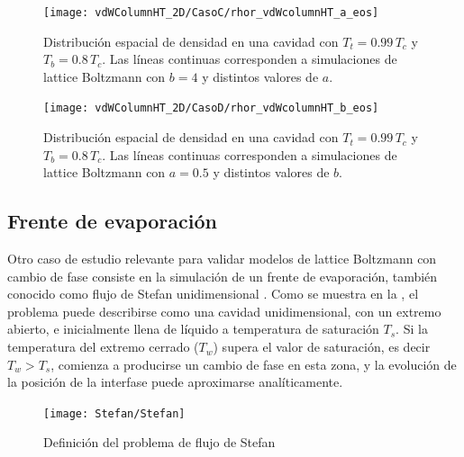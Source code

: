 \begin{figure}[ht]
	\centering
	\texttt{[image: vdWColumnHT\_2D/CasoC/rhor\_vdWcolumnHT\_a\_eos]}
	\caption{Distribuci\'on espacial de densidad en una cavidad con $T_t = 0.99 \, T_c$ y $T_b = 0.8 \, T_c$. Las l\'ineas continuas corresponden a simulaciones de lattice Boltzmann con $b=4$ y distintos valores de $a$.}
	\label{fig:vdWColumnHT_rhor_a_eos}
\end{figure}

\begin{figure}[ht]
	\centering
	\texttt{[image: vdWColumnHT\_2D/CasoD/rhor\_vdWcolumnHT\_b\_eos]}
	\caption{Distribuci\'on espacial de densidad en una cavidad con $T_t = 0.99 \, T_c$ y $T_b = 0.8 \, T_c$. Las l\'ineas continuas corresponden a simulaciones de lattice Boltzmann con $a=0.5$ y distintos valores de $b$.}
	\label{fig:vdWColumnHT_rhor_b_eos}
\end{figure}
\FloatBarrier



\subsection{Frente de evaporaci\'on}
\label{sec:stefan_d2q9}

Otro caso de estudio relevante para validar modelos de lattice Boltzmann con cambio de fase consiste en la simulaci\'on de un frente de evaporaci\'on, tambi\'en conocido como flujo de Stefan unidimensional \cite{alexiades_mathematical_1993}. Como se muestra en la , el problema puede describirse como una cavidad unidimensional, con un extremo abierto, e inicialmente llena de l\'iquido a temperatura de saturaci\'on $T_s$. Si la temperatura del extremo cerrado ($T_w$) supera el valor de saturaci\'on, es decir $T_w > T_s$, comienza a producirse un cambio de fase en esta zona, y la evoluci\'on de la posici\'on de la interfase puede aproximarse anal\'iticamente. 

\begin{figure}[ht]
	\centering
	\texttt{[image: Stefan/Stefan]}
	\caption{Definici\'on del problema de flujo de Stefan}
	\label{fig:Stefan_cavity}
\end{figure}

